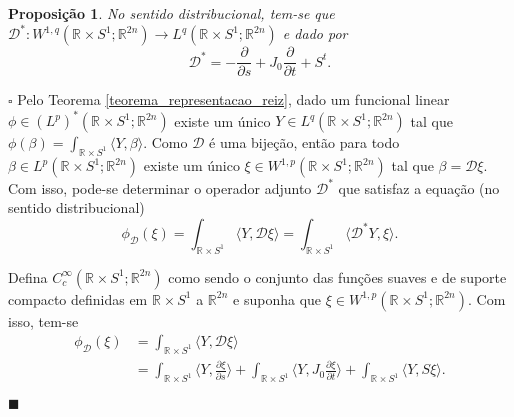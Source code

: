 \documentclass[12pt]{book}
\newtheorem{proposicao}[teorema]{Proposição}
\newenvironment{prova}[1]{$\square$ #1}{\hfill$\blacksquare$}
\newcommand{\circulo}{S^{1}}
\newcommand{\diferencialfloerabrev}{\mathcal{D}}
\newcommand{\derivadaparcial}[2]{\frac{\partial #1}{\partial #2}}
\newcommand{\espacoLpcontradominio}[2]{L^{p}(#1;#2)}
\newcommand{\espacoLpretacirculo}{\espacoLpcontradominio{\retacartesianocirculo}{\real{2n}}}
\newcommand{\espacoLpadjuntoretacirculo}{L^{q}(\retacartesianocirculo;\real{2n})}
\newcommand{\espacoLpdual}{(L^{p})^{*}(\retacartesianocirculo;\real{2n})}
\newcommand{\espacosobolevcontradominio}[2]{W^{1,p}(#1;#2)}
\newcommand{\espacosobolevadjuntoretacirculo}{W^{1,q}(\retacartesianocirculo;\real{2n})}
\newcommand{\espacosobolevretacirculo}{\espacosobolevcontradominio{\retacartesianocirculo}{\real{2n}}}
\newcommand{\estruturacomplexa}{J_{0}}
\newcommand{\produtointerno}[2]{\langle #1, #2 \rangle}
\newcommand{\retacartesianocirculo}{\real{} \times \circulo}
\newcommand{\real}[1]{\mathbb{R}^{#1}}
\begin{document}
	\begin{proposicao}\label{proposicao_diferencial_floer_adjunto}
		No sentido distribucional, tem-se que $\diferencialfloerabrev^{*} :\espacosobolevadjuntoretacirculo \to \espacoLpadjuntoretacirculo$ e dado por
		$$
		\diferencialfloerabrev^{*}=-\derivadaparcial{}{s}+\estruturacomplexa \derivadaparcial{}{t}+S^{t}.
		$$
	\end{proposicao}
	\begin{prova}
		Pelo Teorema \ref{teorema_representacao_reiz}, dado um funcional linear $\phi \in \espacoLpdual$ existe um único $Y \in \espacoLpadjuntoretacirculo$ tal que $\phi(\beta) = \int_{\retacartesianocirculo}\produtointerno{Y}{\beta}$. Como $\diferencialfloerabrev$ é uma bijeção, então para todo $\beta \in \espacoLpretacirculo$ existe um único $\xi \in \espacosobolevretacirculo$ tal que $\beta = \diferencialfloerabrev\xi$. Com isso, pode-se determinar o operador adjunto $\diferencialfloerabrev^{*}$ que satisfaz a equação (no sentido distribucional) 
		$$
		\phi_{\diferencialfloerabrev}(\xi) = \int_{\retacartesianocirculo}\produtointerno{Y}{\diferencialfloerabrev\xi} = \int_{\retacartesianocirculo}\produtointerno{\diferencialfloerabrev^{*}Y}{\xi}.
		$$
		
		Defina $C^{\infty}_{c}(\retacartesianocirculo;\real{2n})$ como sendo o conjunto das funções suaves e de suporte compacto definidas em $\retacartesianocirculo$ a $\real{2n}$ e suponha que $\xi \in \espacosobolevcontradominio{\retacartesianocirculo}{\real{2n}}$. Com isso, tem-se
		$$
		\begin{aligned}
		\phi_{\diferencialfloerabrev}(\xi) 
		&= \int_{\retacartesianocirculo}\produtointerno{Y}{\diferencialfloerabrev\xi}
		\\
		&=
		\int_{\retacartesianocirculo}\produtointerno{Y}{\derivadaparcial{\xi}{s}} + \int_{\retacartesianocirculo}\produtointerno{Y}{\estruturacomplexa\derivadaparcial{\xi}{t}} + \int_{\retacartesianocirculo}\produtointerno{Y}{S\xi}.
		\end{aligned}
		$$
		

\end{prova}
\end{document}
